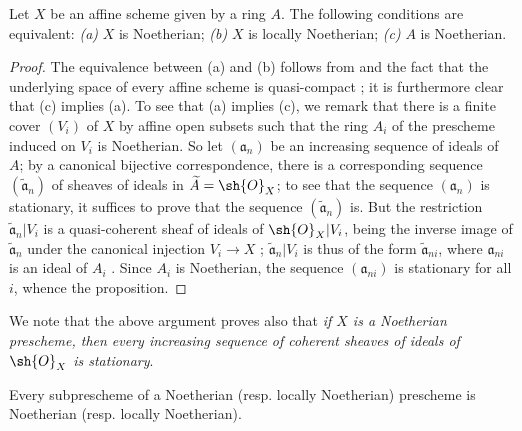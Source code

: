 \begin{proposition}[6.1.3]
\label{I.6.1.3}
Let $X$ be an affine scheme given by a ring $A$.
The following conditions are equivalent:
\emph{(a)} $X$ is Noetherian;
\emph{(b)} $X$ is locally Noetherian;
\emph{(c)} $A$ is Noetherian.
\end{proposition}

\begin{proof}
The equivalence between (a) and (b) follows from  and the fact that the underlying space of every affine scheme is quasi-compact ; it is furthermore clear that (c) implies (a).
To see that (a) implies (c), we remark that there is a finite cover $(V_i)$ of $X$ by affine open subsets such that the ring $A_i$ of the prescheme induced on $V_i$ is Noetherian.
So let $(\mathfrak{a}_n)$ be an increasing sequence of ideals of $A$; by a canonical bijective correspondence, there is a corresponding sequence $(\widetilde{\mathfrak{a}}_n)$ of sheaves of ideals in $\widetilde{A}=\sh{O}_X$;
to see that the sequence $(\mathfrak{a}_n)$ is stationary, it suffices to prove that the sequence $(\widetilde{\mathfrak{a}}_n)$ is.
But the restriction $\widetilde{\mathfrak{a}}_n|V_i$ is a quasi-coherent sheaf of ideals of $\sh{O}_X|V_i$, being the inverse image of $\widetilde{\mathfrak{a}}_n$ under the canonical injection $V_i\to X$ ;
$\widetilde{\mathfrak{a}}_n|V_i$ is thus of the form $\widetilde{\mathfrak{a}}_{ni}$, where $\mathfrak{a}_{ni}$ is an ideal of $A_i$ .
Since $A_i$ is Noetherian, the sequence $(\mathfrak{a}_{ni})$ is stationary for all $i$, whence the proposition.
\end{proof}

We note that the above argument proves also that \emph{if $X$ is a Noetherian prescheme, then every increasing sequence of coherent sheaves of ideals of $\sh{O}_X$ is stationary}.

\begin{proposition}[6.1.4]
\label{I.6.1.4}
Every subprescheme of a Noetherian (resp. locally Noetherian) prescheme is Noetherian (resp. locally Noetherian).
\end{proposition}

